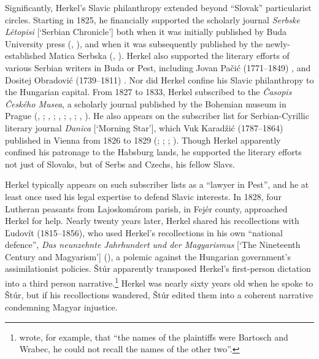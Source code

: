 Significantly, Herkel’s Slavic philanthropy extended beyond “Slovak” particularist circles. Starting in 1825, he financially supported the scholarly journal \textit{Serbske Lětopisi} [‘Serbian Chronicle’] both when it was initially published by Buda University press (, \cite[entry for \textit{Budimъ}]{anon_gg_1825}), and when it was subsequently published by the newly-established Matica Serbska (, \cite[entry for \textit{Peshta}]{anon_gg_1826}). Herkel also supported the literary efforts of various Serbian writers in Buda or Pest, including Jovan Pačić (1771--1849) \citep[entry for \textit{Budimъ}]{pacic_dodatak_1827}, and Dositej Obradović (1739--1811) \citep[entry for \textit{Peshta}]{obradovic_imena_1826}. Nor did Herkel confine his Slavic philanthropy to the Hungarian capital. From 1827 to 1833, Herkel subscribed to the \textit{Časopis Českého Musea}, a scholarly journal published by the Bohemian museum in Prague (, \cite[no page numbers]{anon_gmena_1827}; , \cite[135]{anon_gmena_1829}; , \cite[488]{anon_poznamenanj_1830}; , \cite[491]{anon_pp_1832}; , \cite[no page numbers]{anon_gmena_1833}). He also appears on the subscriber list for Serbian-Cyrillic literary journal \textit{Danica} [‘Morning Star’], which Vuk Karadžić (1787--1864) published in Vienna from 1826 to 1829 (\cite[123]{anon_imena_1826}; \cite[159]{anon_imena_1827}; \cite[no page numbers]{anon_imena_1828}; \cite[no page numbers]{anon_imena_1829}). Though Herkel apparently confined his patronage to the Habsburg lands, he supported the literary efforts not just of Slovaks, but of Serbs and Czechs, his fellow Slavs.

\enlargethispage{\baselineskip}

Herkel typically appears on such subscriber lists as a “lawyer in Pest”, and he at least once used his legal expertise to defend Slavic interests. In 1828, four Lutheran peasants from Lajoskomárom parish, in Fejér county, approached Her\-kel for help. Nearly twenty years later, Herkel shared his recollections with Ľudovít \citeauthor{stur_neunzehnte_1845} (1815--1856), who used Herkel’s recollections in his own “national defence”, \textit{Das neunzehnte Jahrhundert und der Magyarismus} [‘The Nineteenth Century and Magyarism’] (\citeyear{stur_neunzehnte_1845}), a polemic against the Hungarian government’s assimilationist policies. Štúr apparently transposed Herkel’s first-person dictation into a third person narrative.\footnote{\citet[25]{stur_neunzehnte_1845} wrote, for example, that “the names of the plaintiffs were Bartosch and Wrabec, he could not recall the names of the other two”.} Herkel was nearly sixty years old when he spoke to Štúr, but if his recollections wandered, Štúr edited them into a coherent narrative condemning Magyar injustice.

